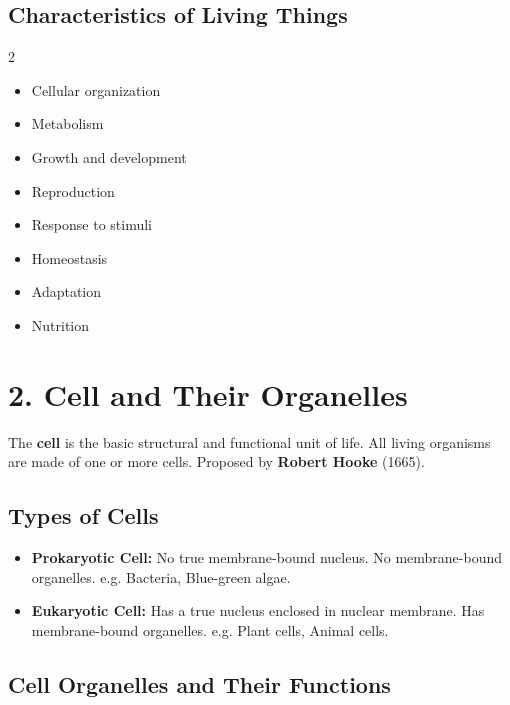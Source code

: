 \documentclass[12pt]{article}
\begin{document}
\subsection{Characteristics of Living Things}
\begin{multicols}{2}
\begin{itemize}[leftmargin=14pt, itemsep=2pt]
  \item Cellular organization
  \item Metabolism
  \item Growth and development
  \item Reproduction
  \item Response to stimuli
  \item Homeostasis
  \item Adaptation
  \item Nutrition
\end{itemize}
\end{multicols}

\section{2. Cell and Their Organelles}

\begin{defbox}[Cell]
The \textbf{cell} is the basic structural and functional unit of life. All living organisms are made of one or more cells. Proposed by \textbf{Robert Hooke} (1665).
\end{defbox}

\subsection{Types of Cells}
\begin{itemize}[leftmargin=16pt, itemsep=4pt]
  \item \textbf{Prokaryotic Cell:} No true membrane-bound nucleus. No membrane-bound organelles. e.g. Bacteria, Blue-green algae.
  \item \textbf{Eukaryotic Cell:} Has a true nucleus enclosed in nuclear membrane. Has membrane-bound organelles. e.g. Plant cells, Animal cells.
\end{itemize}

\subsection{Cell Organelles and Their Functions}
\end{document}
